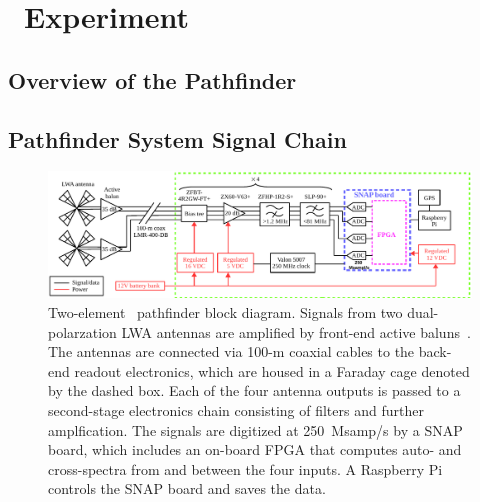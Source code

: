 \chapter{\albatros~Experiment}

    \section{Overview of the Pathfinder}
    \section{Pathfinder System Signal Chain}
	    \begin{figure}
	    	\begin{center} \includegraphics[width=\linewidth]{Figures/pathfinder_schematic.pdf}
	    		\caption{Two-element \albatros\ pathfinder block diagram.  Signals
	    			from two dual-polarzation LWA antennas are amplified by
	    			front-end active baluns~\citep{2012PASP..124.1090H}.  The
	    			antennas are connected via 100-m coaxial cables to the back-end readout electronics, which are housed in a Faraday cage denoted by the dashed box.  Each of the four antenna outputs is passed to a second-stage electronics chain consisting of filters and	further amplfication.  The signals are digitized at 250~Msamp/s by a SNAP board, which includes an on-board FPGA that computes
	    			auto- and cross-spectra from and between the four inputs.  A Raspberry Pi controls the SNAP board and saves the data.}
	    		\label{Fig:albatros2_schem}
	    	\end{center}
	    \end{figure}
   
        \subsection{}
        \subsection{}

